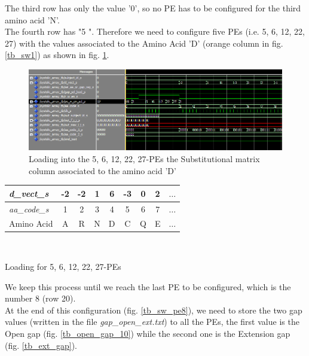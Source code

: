 The third row has only the value '0', so no PE has to be configured for the third amino acid 'N'.\\
The fourth row has "5     ". Therefore we need to configure five PEs (i.e. 5, 6, 12, 22, 27) with the values associated to the Amino Acid 'D' (orange column in fig. \ref{tb_sw1}) as shown in fig. \ref{tb_sw_12}.
\begin{figure}[h!]
	\centering
	\includegraphics[width=\textwidth]{imm/sw/load_pe_5_6_12.png}
	\caption{Loading into the 5, 6, 12, 22, 27-PEs the Substitutional matrix column associated to the amino acid 'D'} 
	\label{tb_sw_12}
\end{figure}
\begin{center}
	
\begin{tabular}{|l|c|c|c|c|c|c|c|c|}
	\hline
	
	\hline
	\textit{d\_vect\_s} & -2 & -2 & 1& 6& -3 & 0 & 2& $ \dots $\\
	\hline
	\textit{aa\_code\_s} & 1& 2& 3 &4 &5& 6& 7 & $ \dots $\\
	\hline
	Amino Acid & A& R& N &D &C& Q& E & $ \dots $\\
	\hline
\end{tabular}\\

\end{center}
\begin{center}
	Loading for 5, 6, 12, 22, 27-PEs
\end{center}
We keep this process until we reach the last PE to be configured, which is the number 8 (row 20).\\At the end of this configuration (fig. \ref{tb_sw_pe8}), we need to store the two gap values (written in the file \textit{gap\_open\_ext.txt}) to all the PEs, the first value is the Open gap (fig. \ref{tb_open_gap_10}) while the second one is the Extension gap (fig. \ref{tb_ext_gap}).


